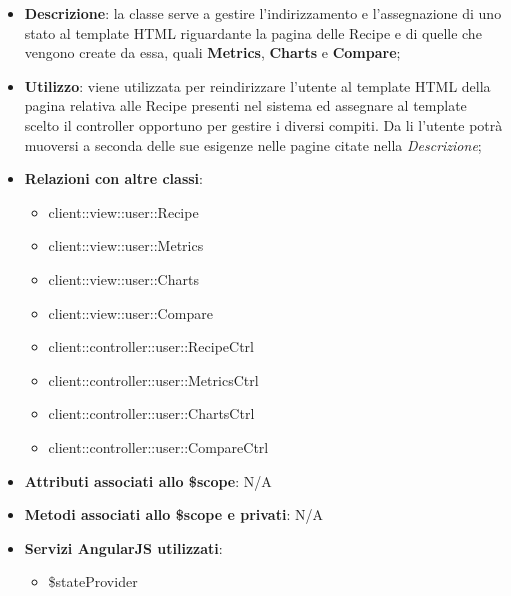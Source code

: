 			\begin{itemize}
				\item \textbf{Descrizione}: la classe serve a gestire l'indirizzamento e l'assegnazione di uno stato al template HTML riguardante la pagina delle Recipe e di quelle che vengono create da essa, quali \textbf{Metrics}, \textbf{Charts} e \textbf{Compare};
				\item \textbf{Utilizzo}: viene utilizzata per reindirizzare l'utente al template HTML della pagina relativa alle Recipe presenti nel sistema ed assegnare al template scelto il controller opportuno per gestire i diversi compiti.  Da li l'utente potrà muoversi a seconda delle sue esigenze nelle pagine citate nella \emph{Descrizione};
				\item \textbf{Relazioni con altre classi}:
					\begin{itemize}
						\item client::view::user::Recipe
						\item client::view::user::Metrics
						\item client::view::user::Charts
						\item client::view::user::Compare
						\item client::controller::user::RecipeCtrl
						\item client::controller::user::MetricsCtrl
						\item client::controller::user::ChartsCtrl
						\item client::controller::user::CompareCtrl
					\end{itemize}
				\item \textbf{Attributi associati allo \$scope}: N/A
				\item \textbf{Metodi associati allo \$scope e privati}: N/A
				\item \textbf{Servizi AngularJS utilizzati}:
					\begin{itemize}
						\item \$stateProvider
					\end{itemize}
			\end{itemize}

